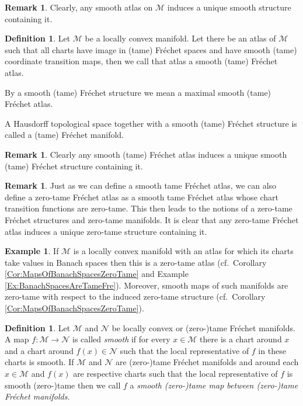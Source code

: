 \documentclass[12pt,a4paper]{article}
\theoremstyle{plain}
\theoremstyle{definition}
\newtheorem{definition}[theorem]{Definition}
\newtheorem{example}[theorem]{Example}
\newtheorem{remark}[theorem]{Remark}
\newcommand{\Mcal}{\mathcal{M}}
\newcommand{\Ncal}{\mathcal{N}}
\begin{document}
\begin{remark}
Clearly, any smooth atlas on $\Mcal$ induces a unique smooth structure containing it.    
\end{remark}

\begin{definition}{\cite[p.~146]{hamilton}}
Let $\Mcal$ be a locally convex manifold. Let there be an atlas of $\Mcal$ such that all charts have image in (tame) Fréchet spaces and have smooth (tame) coordinate transition maps, then we call that atlas a smooth (tame) Fréchet atlas.

By a smooth (tame) Fréchet structure we mean a maximal smooth (tame) Fréchet atlas. 

A Hausdorff topological space together with a smooth (tame) Fréchet structure is called a (tame) Fréchet manifold. 
\end{definition}

\begin{remark}
Clearly any smooth (tame) Fréchet atlas induces a unique smooth (tame) Fréchet structure containing it.
\end{remark}

\begin{remark}
Just as we can define a smooth tame Fréchet atlas, we can also define a zero-tame Fréchet atlas as a smooth tame Fréchet atlas whose chart transition functions are zero-tame. This then leads to the notions of a zero-tame Fréchet structures and zero-tame manifolds. It is clear that any zero-tame Fréchet atlas induces a unique zero-tame structure containing it.
\end{remark}

\begin{example}
\label{Example:ManifoldsModelledOnBanachSpaces}
If $\mathcal{M}$ is a locally convex manifold with an atlas for which its charts take values in Banach spaces then this is a zero-tame atlas (cf.~Corollary \ref{Cor:MapsOfBanachSpacesZeroTame} and Example \ref{Ex:BanachSpacesAreTameFre}). Moreover, smooth maps of such manifolds are zero-tame with respect to the induced zero-tame structure (cf.~Corollary \ref{Cor:MapsOfBanachSpacesZeroTame}).
\end{example}


\begin{definition}
Let $\Mcal$ and $\Ncal$ be locally convex or (zero-)tame Fréchet manifolds. A map $f:\Mcal\to \Ncal$ is called \textit{smooth} if for every $x\in \Mcal$ there is a chart around $x$ and a chart around $f(x)\in \Ncal$ such that the local representative of $f$ in these charts is smooth. If $\Mcal$ and $\Ncal$ are (zero-)tame Fréchet manifolds and around each $x\in \Mcal$ and $f(x)$ are respective charts such that the local representative of $f$ is smooth (zero-)tame then we call $f$ a \textit{smooth (zero-)tame map between (zero-)tame Fréchet manifolds}.
\end{definition}
\end{document}
